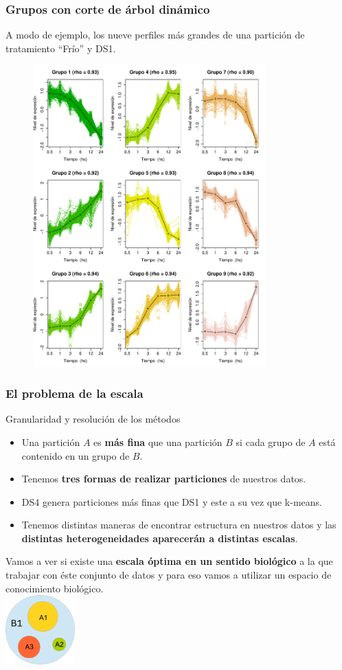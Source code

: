 \documentclass[serif,9pt, t]{beamer}
\begin{document}
\begin{frame}\frametitle{Grupos con corte de árbol dinámico} 
\centering
A modo de ejemplo, los nueve perfiles más grandes de una partición de tratamiento ``Frío'' y DS1.\\
\begin{figure}
\centering
\includegraphics[width=0.8\textwidth, height=0.8\textheight]{perfiles_ds_1.pdf}	
\end{figure}
\end{frame}

\begin{frame}\frametitle{El problema de la escala} 
Granularidad y resolución de los métodos
\bigskip
\begin{itemize}
\item Una partición $A$ es \textbf{más fina} que una partición $B$ si cada grupo de $A$ está contenido en un grupo de $B$.
\item Tenemos \textbf{tres formas de realizar particiones} de nuestros datos.
\item DS4 genera particiones más finas que DS1 y este a su vez que k-means.
\item Tenemos distintas maneras de encontrar estructura en nuestros datos y las \textbf{distintas heterogeneidades aparecerán a distintas escalas}.
\end{itemize}
\bigskip
Vamos a ver si existe una \textbf{escala óptima en un sentido biológico} a la que trabajar con éste conjunto de datos y para eso vamos a utilizar un espacio de conocimiento biológico.\\
\hfill
\includegraphics[width=0.2\textwidth]{granularidad.pdf}	
\end{frame}
\end{document}
